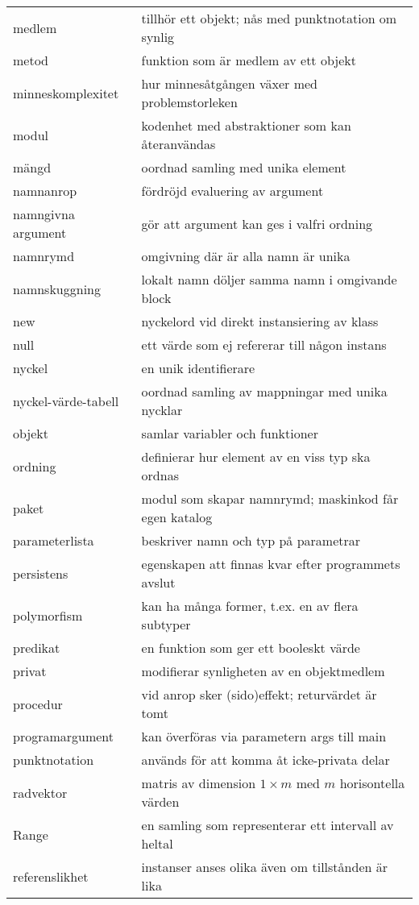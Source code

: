 \begin{tabular}{l|l}
medlem & tillhör ett objekt; nås med punktnotation om synlig \\
metod & funktion som är medlem av ett objekt \\
minneskomplexitet & hur minnesåtgången växer med problemstorleken \\
modul & kodenhet med abstraktioner som kan återanvändas \\
mängd & oordnad samling med unika element \\
namnanrop & fördröjd evaluering av argument \\
namngivna argument & gör att argument kan ges i valfri ordning \\
namnrymd & omgivning där är alla namn är unika \\
namnskuggning & lokalt namn döljer samma namn i omgivande block \\
new & nyckelord vid direkt instansiering av klass \\
null & ett värde som ej refererar till någon instans \\
nyckel & en unik identifierare \\
nyckel-värde-tabell & oordnad samling av mappningar med unika nycklar \\
objekt & samlar variabler och funktioner \\
ordning & definierar hur element av en viss typ ska ordnas \\
paket & modul som skapar namnrymd; maskinkod får egen katalog \\
parameterlista & beskriver namn och typ på parametrar \\
persistens & egenskapen att finnas kvar efter programmets avslut \\
polymorfism & kan ha många former, t.ex. en av flera subtyper \\
predikat & en funktion som ger ett booleskt värde \\
privat & modifierar synligheten av en objektmedlem \\
procedur & vid anrop sker (sido)effekt; returvärdet är tomt \\
programargument & kan överföras via parametern args till main \\
punktnotation & används för att komma åt icke-privata delar \\
radvektor & matris av dimension $1\times{}m$ med $m$ horisontella värden \\
Range & en samling som representerar ett intervall av heltal \\
referenslikhet & instanser anses olika även om tillstånden är lika \\

\end{tabular}
